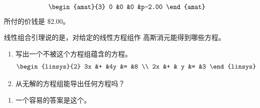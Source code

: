 \begin{exercises}
\begin{answer}
\begin{align*}
\begin{amat}{3}
          0  &0    &0      &p-2.00
        \end{amat}
     \end{align*}
     所付的价钱是 \$$2.00$。
   \end{answer}
  \item 
   线性组合引理说的是，对给定的线性方程组作
   高斯消元能得到哪些方程。
   \begin{enumerate}
     \item 写出一个不被这个方程组蕴含的方程。
       \begin{equation*}
         \begin{linsys}{2}
           3x  &+  &4y  &=  &8 \\
           2x  &+  & y  &=  &3 
         \end{linsys}
       \end{equation*}
     \item 从无解的方程组能导出任何方程吗？
   \end{enumerate}
   \begin{answer}
     \begin{enumerate}
        \item 一个容易的答案是这个。

\end{enumerate}
\end{answer}
\end{exercises}

